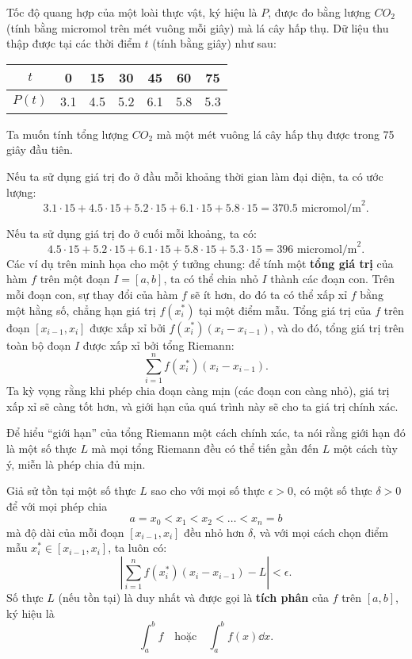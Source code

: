 \begin{example}
    Tốc độ quang hợp của một loài thực vật, ký hiệu là $P$, được đo bằng lượng $CO_2$ (tính bằng micromol trên mét vuông mỗi giây) mà lá cây hấp thụ. Dữ liệu thu thập được tại các thời điểm $t$ (tính bằng giây) như sau:
    \begin{center}
    \begin{tabular}{|c|c|c|c|c|c|c|}
        \hline
        $t$ & 0 & 15 & 30 & 45 & 60 & 75 \\
        \hline
        $P(t)$ & 3.1 & 4.5 & 5.2 & 6.1 & 5.8 & 5.3 \\
        \hline
    \end{tabular}
    \end{center}
    Ta muốn tính tổng lượng $CO_2$ mà một mét vuông lá cây hấp thụ được trong 75 giây đầu tiên.
    
    Nếu ta sử dụng giá trị đo ở đầu mỗi khoảng thời gian làm đại diện, ta có ước lượng:
    \[ 3.1 \cdot 15 + 4.5 \cdot 15 + 5.2 \cdot 15 + 6.1 \cdot 15 + 5.8 \cdot 15 = 370.5 \text{ micromol/m}^2. \]
    
    Nếu ta sử dụng giá trị đo ở cuối mỗi khoảng, ta có:
    \[ 4.5 \cdot 15 + 5.2 \cdot 15 + 6.1 \cdot 15 + 5.8 \cdot 15 + 5.3 \cdot 15 = 396 \text{ micromol/m}^2. \]
    Các ví dụ trên minh họa cho một ý tưởng chung: để tính một \textbf{tổng giá trị} của hàm $f$ trên một đoạn $I = [a, b]$, ta có thể chia nhỏ $I$ thành các đoạn con. Trên mỗi đoạn con, sự thay đổi của hàm $f$ sẽ ít hơn, do đó ta có thể xấp xỉ $f$ bằng một hằng số, chẳng hạn giá trị $f(x_i^*)$ tại một điểm mẫu. Tổng giá trị của $f$ trên đoạn $[x_{i-1}, x_i]$ được xấp xỉ bởi $f(x_i^*)(x_i - x_{i-1})$, và do đó, tổng giá trị trên toàn bộ đoạn $I$ được xấp xỉ bởi tổng Riemann:
    \[ \sum_{i=1}^{n} f(x_i^*) (x_i - x_{i-1}). \]
    Ta kỳ vọng rằng khi phép chia đoạn càng mịn (các đoạn con càng nhỏ), giá trị xấp xỉ sẽ càng tốt hơn, và giới hạn của quá trình này sẽ cho ta giá trị chính xác.
\end{example}

Để hiểu ``giới hạn'' của tổng Riemann một cách chính xác, ta nói rằng giới hạn đó là một số thực $L$ mà mọi tổng Riemann đều có thể tiến gần đến $L$ một cách tùy ý, miễn là phép chia đủ mịn.

\begin{definition}
    Giả sử tồn tại một số thực $L$ sao cho với mọi số thực $\epsilon > 0$, có một số thực $\delta > 0$ để với mọi phép chia
    \[ a = x_0 < x_1 < x_2 < \dots < x_n = b \]
    mà độ dài của mỗi đoạn $[x_{i-1}, x_i]$ đều nhỏ hơn $\delta$, và với mọi cách chọn điểm mẫu $x_i^* \in [x_{i-1}, x_i]$, ta luôn có:
    \[ \left| \sum_{i=1}^{n} f(x_i^*) (x_i - x_{i-1}) - L \right| < \epsilon. \]
    Số thực $L$ (nếu tồn tại) là duy nhất và được gọi là \textbf{tích phân} của $f$ trên $[a, b]$, ký hiệu là
    \[ \int_{a}^{b} f \quad \text{hoặc} \quad \int_{a}^{b} f(x) \dd x. \]
\end{definition}

